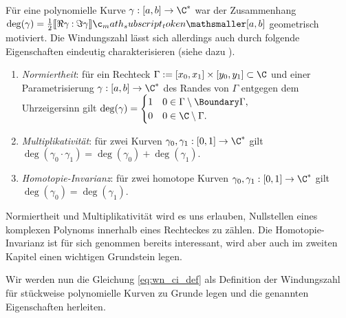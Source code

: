 \documentclass{mythesis}
\begin{document}
Für eine polynomielle Kurve $\gamma: [a,b] \to \C^*$ war der Zusammenhang
\begin{math}[numbered] \label{eq:wn_ci_def}
    \deg(\gamma) = \frac{1}{2} \Index{[a,b]}{\Re \gamma}{\Im \gamma}
\end{math}
geometrisch motiviert.
Die Windungszahl lässt sich allerdings auch durch folgende Eigenschaften eindeutig charakterisieren (siehe dazu \cite[Theorem 5.13, (3)]{eiserm_fundthmalg}).
\begin{enumerate}[(W1),leftmargin=3.5em]
    \item
        \emph{Normiertheit}: für ein Rechteck $\Gamma := [x_0, x_1] \times [y_0, y_1] \subset \C$ und einer Parametrisierung $\gamma: [a,b] \to \C^*$ des Randes von $\Gamma$ entgegen dem Uhrzeigersinn gilt
        \begin{math}
            \deg(\gamma) = \begin{cases}
                1 & 0 \in \Gamma \setminus \Boundary\Gamma, \\
                0 & 0 \in \C \setminus \Gamma.
            \end{cases}
        \end{math}
    \item
        \emph{Multiplikativität}: für zwei Kurven $\gamma_0, \gamma_1: [0,1] \to \C^*$ gilt
        \begin{math}
            \deg(\gamma_0 \cdot \gamma_1) = \deg(\gamma_0) + \deg(\gamma_1).
        \end{math}
    \item
        \emph{Homotopie-Invarianz}: für zwei homotope Kurven $\gamma_0, \gamma_1: [0,1] \to \C^*$ gilt
        \begin{math}
            \deg(\gamma_0) = \deg(\gamma_1).
        \end{math}
\end{enumerate}
Normiertheit und Multiplikativität wird es uns erlauben, Nullstellen eines komplexen Polynoms innerhalb eines Rechteckes zu zählen.
Die Homotopie-Invarianz ist für sich genommen bereits interessant, wird aber auch im zweiten Kapitel einen wichtigen Grundstein legen.

Wir werden nun die Gleichung \eqref{eq:wn_ci_def} als Definition der Windungszahl für stückweise polynomielle Kurven zu Grunde legen und die genannten Eigenschaften herleiten.
\end{document}
